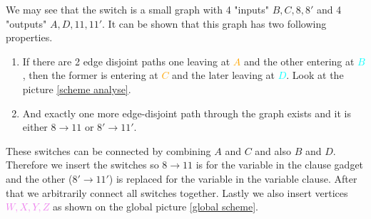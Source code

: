 We may see that the switch is a small graph with 4 "inputs" $B, C, 8, 8'$ and 4 "outputs" $A, D, 11, 11'$. It can be shown that this graph has two following properties.

\begin{enumerate}
	\item If there are 2 edge disjoint paths one leaving at \textcolor{orange}{$A$} and the other entering at \textcolor{cyan}{$B$}, then the former is entering at \textcolor{orange}{$C$} and the later leaving at \textcolor{cyan}{$D$}. Look at the picture \ref{scheme analyse}.
	\item And exactly one more edge-disjoint path through the graph exists and it is either $8 \to 11$ or $8' \to 11'$.
\end{enumerate}

These switches can be connected by combining $A$ and $C$ and also $B$ and $D$. Therefore we insert the switches so $8 \to 11$ is for the variable in the clause gadget and the other ($8' \to 11'$) is replaced for the variable in the variable clause. After that we arbitrarily connect all switches together. Lastly we also insert vertices \textcolor{violet}{$W, X, Y, Z$} as shown on the global picture \ref{global scheme}.

